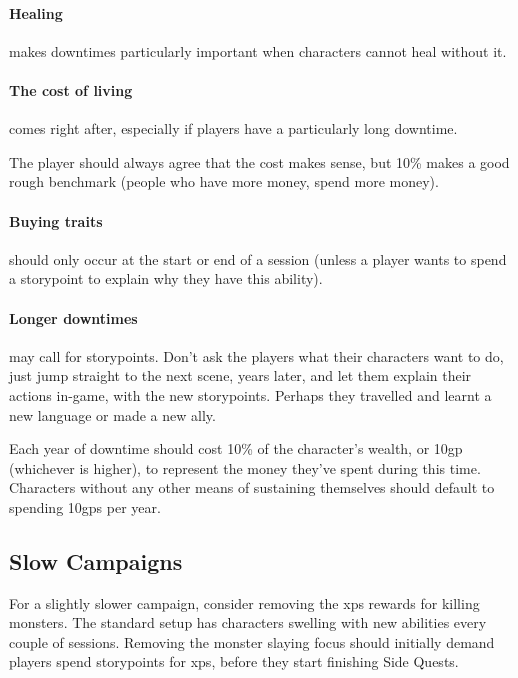\begin{multicols}{2}
\paragraph{Healing}
makes \glspl{downtime} particularly important when characters cannot heal without it.

\paragraph{The cost of living}
comes right after, especially if players have a particularly long \gls{downtime}.

The player should always agree that the cost makes sense, but 10\% makes a good rough benchmark (people who have more money, spend more money).

\paragraph{Buying traits}
should only occur at the start or end of a session (unless a player wants to spend a \gls{storypoint} to explain why they have this ability).


\paragraph{Longer \glspl{downtime}}
may call for \glspl{storypoint}.
Don't ask the players what their characters want to do, just jump straight to the next scene, years later, and let them explain their actions in-game, with the new \glspl{storypoint}.
Perhaps they travelled and learnt a new language or made a new ally.

Each year of downtime should cost 10\% of the character's wealth, or 10\gls{gp} (whichever is higher), to represent the money they've spent during this time.
Characters without any other means of sustaining themselves should default to spending 10\glspl{gp} per year.

\subsection{Slow Campaigns}

For a slightly slower campaign, consider removing the \glspl{xp} rewards for killing monsters.
The standard setup has characters swelling with new abilities every couple of sessions.
Removing the monster slaying focus should initially demand players spend \glspl{storypoint} for \glspl{xp}, before they start finishing Side Quests.

\end{multicols}

